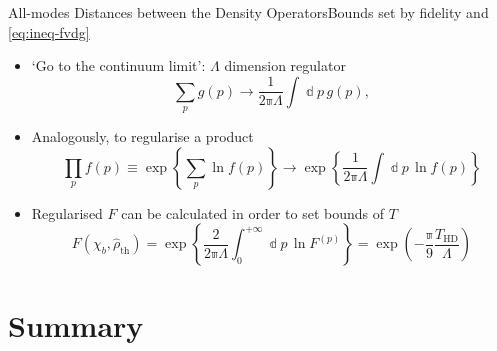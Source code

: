 \documentclass{beamer}
\newcommand{\pp}{{\Bbbpi}}
\newcommand{\rbr}[1]{{\left(#1\right)}}
\newcommand{\rfun}[2]{{#1}\mathopen{}\left(#2\right)\mathclose{}}
\newcommand{\cfun}[2]{{#1}\mathopen{}\left\{#2\right\}\mathclose{}}
\newcommand{\dd}{\Bbbd}
\newcommand{\what}[1]{{\widehat{#1}}}
\begin{document}
\begin{frame}[allowframebreaks]{All-modes Distances between the Density 
Operators}{Bounds set by fidelity and \cref{eq:ineq-fvdg}}

\begin{itemize}

\item `Go to the continuum limit': $\Lambda$ dimension regulator
\begin{equation}
\sum_p \rfun{g}{p} \to \frac{1}{2\pp\Lambda} \int \dd p\,\rfun{g}{p},
\end{equation}

\item Analogously, to regularise a product
\begin{equation}
\prod_p \rfun{f}{p} \equiv \cfun{\exp}{\sum_p 
\ln\rfun{f}{p}} \to \cfun{\exp}{\frac{1}{2\pp\Lambda}
\int \dd p\,\ln\rfun{f}{p}}
\end{equation}

\item Regularised $F$ can be calculated \alert{in order to set bounds of $T$}
\begin{equation}
\rfun{F}{\chi_b, \what{\rho}_\text{th}} = 
\cfun{\exp}{\frac{2}{2\pp\Lambda}\int_0^{+\infty}\dd p\,\ln F^{\rbr{p}}} =
\rfun{\exp}{-\frac{\pp}{9} \frac{T_\text{HD}}{\Lambda}}
\end{equation}
\end{itemize}


%

\end{frame}



\section*{Summary}
\end{document}
